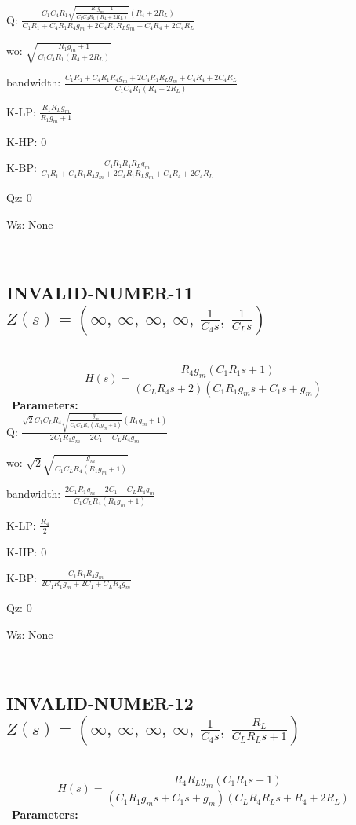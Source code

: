 \documentclass{article}
\begin{document}
Q: $\frac{C_{1} C_{4} R_{1} \sqrt{\frac{R_{1} g_{m} + 1}{C_{1} C_{4} R_{1} \left(R_{4} + 2 R_{L}\right)}} \left(R_{4} + 2 R_{L}\right)}{C_{1} R_{1} + C_{4} R_{1} R_{4} g_{m} + 2 C_{4} R_{1} R_{L} g_{m} + C_{4} R_{4} + 2 C_{4} R_{L}}$\ 

wo: $\sqrt{\frac{R_{1} g_{m} + 1}{C_{1} C_{4} R_{1} \left(R_{4} + 2 R_{L}\right)}}$\ 

bandwidth: $\frac{C_{1} R_{1} + C_{4} R_{1} R_{4} g_{m} + 2 C_{4} R_{1} R_{L} g_{m} + C_{4} R_{4} + 2 C_{4} R_{L}}{C_{1} C_{4} R_{1} \left(R_{4} + 2 R_{L}\right)}$\ 

K-LP: $\frac{R_{1} R_{L} g_{m}}{R_{1} g_{m} + 1}$\ 

K-HP: $0$\ 

K-BP: $\frac{C_{4} R_{1} R_{4} R_{L} g_{m}}{C_{1} R_{1} + C_{4} R_{1} R_{4} g_{m} + 2 C_{4} R_{1} R_{L} g_{m} + C_{4} R_{4} + 2 C_{4} R_{L}}$\ 

Qz: $0$\ 

Wz: $\text{None}$\ 

\ 

\subsection{INVALID-NUMER-11 $Z(s) = \left( \infty, \  \infty, \  \infty, \  \infty, \  \frac{1}{C_{4} s}, \  \frac{1}{C_{L} s}\right)$ } \ 
\textbf{\[H(s) = \frac{R_{4} g_{m} \left(C_{1} R_{1} s + 1\right)}{\left(C_{L} R_{4} s + 2\right) \left(C_{1} R_{1} g_{m} s + C_{1} s + g_{m}\right)}\] } \ 
\textbf{Parameters:}\\ 

Q: $\frac{\sqrt{2} C_{1} C_{L} R_{4} \sqrt{\frac{g_{m}}{C_{1} C_{L} R_{4} \left(R_{1} g_{m} + 1\right)}} \left(R_{1} g_{m} + 1\right)}{2 C_{1} R_{1} g_{m} + 2 C_{1} + C_{L} R_{4} g_{m}}$\ 

wo: $\sqrt{2} \sqrt{\frac{g_{m}}{C_{1} C_{L} R_{4} \left(R_{1} g_{m} + 1\right)}}$\ 

bandwidth: $\frac{2 C_{1} R_{1} g_{m} + 2 C_{1} + C_{L} R_{4} g_{m}}{C_{1} C_{L} R_{4} \left(R_{1} g_{m} + 1\right)}$\ 

K-LP: $\frac{R_{4}}{2}$\ 

K-HP: $0$\ 

K-BP: $\frac{C_{1} R_{1} R_{4} g_{m}}{2 C_{1} R_{1} g_{m} + 2 C_{1} + C_{L} R_{4} g_{m}}$\ 

Qz: $0$\ 

Wz: $\text{None}$\ 

\ 

\subsection{INVALID-NUMER-12 $Z(s) = \left( \infty, \  \infty, \  \infty, \  \infty, \  \frac{1}{C_{4} s}, \  \frac{R_{L}}{C_{L} R_{L} s + 1}\right)$ } \ 
\textbf{\[H(s) = \frac{R_{4} R_{L} g_{m} \left(C_{1} R_{1} s + 1\right)}{\left(C_{1} R_{1} g_{m} s + C_{1} s + g_{m}\right) \left(C_{L} R_{4} R_{L} s + R_{4} + 2 R_{L}\right)}\] } \ 
\textbf{Parameters:}\\ 
\end{document}
